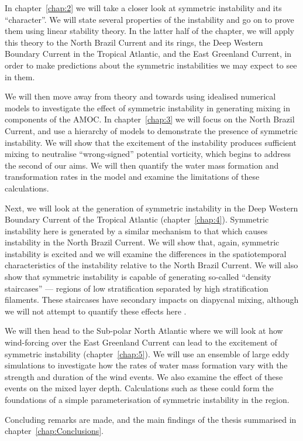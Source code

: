 In chapter~\ref{chap:2} we will take a closer look at symmetric instability and its ``character''. We will state several properties of the instability and go on to prove them using linear stability theory. In the latter half of the chapter, we will apply this theory to the North Brazil Current and its rings, the Deep Western Boundary Current in the Tropical Atlantic, and the East Greenland Current, in order to make predictions about the symmetric instabilities we may expect to see in them.

We will then move away from theory and towards using idealised numerical models to investigate the effect of symmetric instability in generating mixing in components of the AMOC. In chapter~\ref{chap:3} we will focus on the North Brazil Current, and use a hierarchy of models to demonstrate the presence of symmetric instability. We will show that the excitement of the instability produces sufficient mixing to neutralise ``wrong-signed'' potential vorticity, which begins to address the second of our aims. We will then quantify the water mass formation and transformation rates in the model and examine the limitations of these calculations.

Next, we will look at the generation of symmetric instability in the Deep Western Boundary Current of the Tropical Atlantic (chapter~\ref{chap:4}). Symmetric instability here is generated by a similar mechanism to that which causes instability in the North Brazil Current. We will show that, again, symmetric instability is excited and we will examine the differences in the spatiotemporal characteristics of the instability relative to the North Brazil Current. We will also show that symmetric instability is capable of generating so-called ``density staircases'' --- regions of low stratification separated by high stratification filaments. These staircases have secondary impacts on diapycnal mixing, although we will not attempt to quantify these effects here \citep{Schmitt2005}.

We will then head to the Sub-polar North Atlantic where we will look at how wind-forcing over the East Greenland Current can lead to the excitement of symmetric instability (chapter~\ref{chap:5}). We will use an ensemble of large eddy simulations to investigate how the rates of water mass formation vary with the strength and duration of the wind events. We also examine the effect of these events on the mixed layer depth. Calculations such as these could form the foundations of a simple parameterisation of symmetric instability in the region.

Concluding remarks are made, and the main findings of the thesis summarised in chapter~\ref{chap:Conclusions}.
